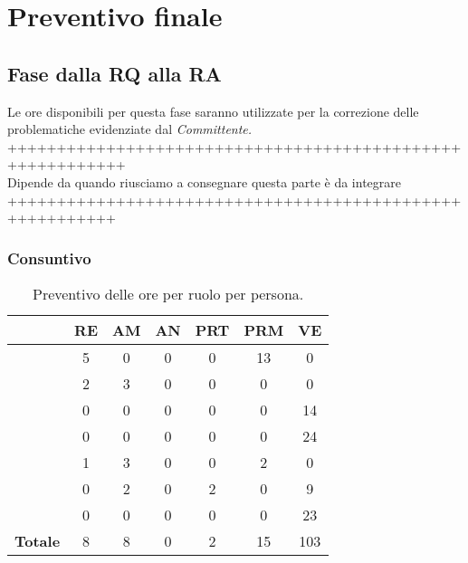 \section{Preventivo finale}{

	\subsection{Fase dalla RQ alla RA}{
	
	Le ore disponibili per questa fase saranno utilizzate per la correzione delle problematiche evidenziate dal \textit{Committente.}\\
	++++++++++++++++++++++++++++++++++++++++++++++++++++++++++\\
	Dipende da quando riusciamo a consegnare questa parte è da integrare
	+++++++++++++++++++++++++++++++++++++++++++++++++++++++++\\
	
	\subsubsection{Consuntivo}
	\begin{table}[h!]
		\begin{center}
			\begin{tabular}{l c c c c c c}				
				\toprule
				&	RE& AM& AN& PRT& PRM& VE \\ 
				\midrule
				\BM	&	5	&	0	&	0	&	0	&	13	&	0\\ 
				\BA	&	2	&	3	&	0	&	0	&	0	&	0\\
				\CD	&	0	&	0	&	0	&	0	&	0	&	14\\ 
				\LS	&	0	&	0	&	0	&	0	&	0	&	24\\
				\PV &	1	&	3	&	0	&	0	&	2	&	0\\
				\ZF 	&	0	&	2	&	0	&	2	&	0	&	9\\
				\ZE &	0	&	0	&	0	&	0	&	0	&	23\\ \hline
				\textbf{Totale}&	 8 &	8 &	0	&	2 &		15 & 103\\
				\bottomrule
			\end{tabular}	
		\caption{Preventivo delle ore per ruolo per persona.}
		\end{center}
	\end{table}
	
		\begin{table}[h!]
		\begin{center}
			\renewcommand{\arraystretch}{1.5}%
			\begin{tabular}{c| c c c c c c c |c }
				

\end{tabular}
\end{center}
\end{table}}}
